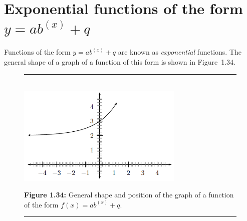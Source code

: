 \section{ Exponential functions of the form $y=a{b}^{\left(x\right)}+q$}
\nopagebreak
{}         
\label{m39348*id249604}Functions of the form $y=a{b}^{\left(x\right)}+q$ are known as \textsl{exponential} functions. The general shape of a graph of a function of this form is shown in Figure~1.34.\par 
\setcounter{subfigure}{0}
\begin{figure}[H] %
\begin{center}
\rule[.1in]{\figurerulewidth}{.005in} \\
\label{m39348*uid173!!!underscore!!!media}\label{m39348*uid173!!!underscore!!!printimage}\includegraphics[width=300px]{col11306.imgs/m39348_MG10C11_027.png} %
\vspace{2pt}
\vspace{\rubberspace}\par \begin{cnxcaption}
\small \textbf{Figure 1.34: }General shape and position of the graph of a function of the form $f\left(x\right)=a{b}^{\left(x\right)}+q$.
\end{cnxcaption}
\vspace{.1in}
\rule[.1in]{\figurerulewidth}{.005in} \\
\end{center}
\end{figure}       
\label{m39348*secfhsst!!!underscore!!!id3489}
\nopagebreak
